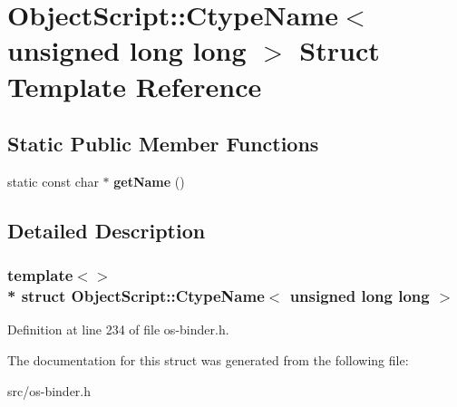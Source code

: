 \hypertarget{struct_object_script_1_1_ctype_name_3_01unsigned_01long_01long_01_4}{}\section{Object\+Script\+:\+:Ctype\+Name$<$ unsigned long long $>$ Struct Template Reference}
\label{struct_object_script_1_1_ctype_name_3_01unsigned_01long_01long_01_4}
\subsection*{Static Public Member Functions}
\begin{DoxyCompactItemize}
\item 
static const char $\ast$ {\bfseries get\+Name} ()\hypertarget{struct_object_script_1_1_ctype_name_3_01unsigned_01long_01long_01_4_af533c5708d7ffc1dfe94a8f5130f82f0}{}\label{struct_object_script_1_1_ctype_name_3_01unsigned_01long_01long_01_4_af533c5708d7ffc1dfe94a8f5130f82f0}

\end{DoxyCompactItemize}


\subsection{Detailed Description}
\subsubsection*{template$<$$>$\\*
struct Object\+Script\+::\+Ctype\+Name$<$ unsigned long long $>$}



Definition at line 234 of file os-\/binder.\+h.



The documentation for this struct was generated from the following file\+:\begin{DoxyCompactItemize}
\item 
src/os-\/binder.\+h\end{DoxyCompactItemize}
